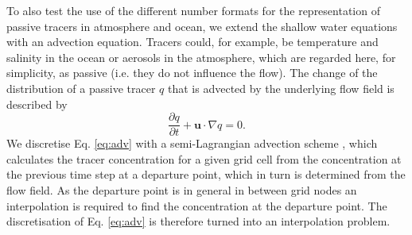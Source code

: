 \documentclass[draft]{agujournal2019}
\begin{document}
To also test the use of the different number formats for the representation of passive tracers in atmosphere and ocean, we extend the shallow water equations with an advection equation. Tracers could, for example, be temperature and salinity in the ocean or aerosols in the atmosphere, which are regarded here, for simplicity, as passive (i.e. they do not influence the flow). The change of the distribution of a passive tracer $q$ that is advected by the underlying flow field is described by
\begin{equation}
\frac{\partial q}{\partial t} + \mathbf{u} \cdot \nabla q = 0.
\label{eq:adv}
\end{equation}
We discretise Eq. \ref{eq:adv} with a semi-Lagrangian advection scheme \cite{Smolarkiewicz1992}, which calculates the tracer concentration for a given grid cell from the concentration at the previous time step at a departure point, which in turn is determined from the flow field. As the departure point is in general in between grid nodes an interpolation is required to find the concentration at the departure point. The discretisation of Eq. \ref{eq:adv} is therefore turned into an interpolation problem.
\end{document}
